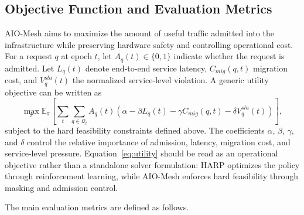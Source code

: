 \documentclass[final,5p]{elsarticle}
\begin{document}
\subsection{Objective Function and Evaluation Metrics}
\label{subsec:objective_metrics}

AIO-Mesh aims to maximize the amount of useful traffic admitted into the infrastructure while preserving hardware safety and controlling operational cost. For a request \(q\) at epoch \(t\), let \(A_q(t) \in \{0,1\}\) indicate whether the request is admitted. Let \(L_q(t)\) denote end-to-end service latency, \(C_{mig}(q,t)\) migration cost, and \(V_q^{sla}(t)\) the normalized service-level violation. A generic utility objective can be written as
\begin{equation}
    \max_{\pi}
    \mathbb{E}_{\pi}
    \left[
        \sum_{t}
        \sum_{q \in \mathcal{Q}_t}
        A_q(t)
        \left(
            \alpha
            - \beta L_q(t)
            - \gamma C_{mig}(q,t)
            - \delta V_q^{sla}(t)
        \right)
    \right],
    \label{eq:utility}
\end{equation}
subject to the hard feasibility constraints defined above. The coefficients \(\alpha\), \(\beta\), \(\gamma\), and \(\delta\) control the relative importance of admission, latency, migration cost, and service-level pressure. Equation~\eqref{eq:utility} should be read as an operational objective rather than a standalone solver formulation: HARP optimizes the policy through reinforcement learning, while AIO-Mesh enforces hard feasibility through masking and admission control.

The main evaluation metrics are defined as follows.
\end{document}
